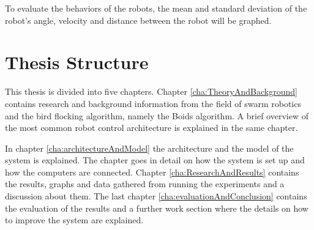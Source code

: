To evaluate the behaviors of the robots, the mean and standard deviation of the robot's angle, velocity and distance between the robot will be graphed. 




\section{Thesis Structure}
\label{sec:thesisStructure}
This thesis is divided into five chapters. Chapter \ref{cha:TheoryAndBackground} contains research and background information from the field of swarm robotics and the bird flocking algorithm, namely the Boids algorithm. A brief overview of the most common robot control architecture is explained in the same chapter.

In chapter \ref{cha:architectureAndModel} the architecture and the model of the system is explained. The chapter goes in detail on how the system is set up and how the computers are connected.
Chapter \ref{cha:ResearchAndResults} contains the results, graphs and data gathered from running the experiments and a discussion about them. The last chapter \ref{cha:evaluationAndConclusion} contains the evaluation of the results and a further work section where the details on how to improve the system are explained.

